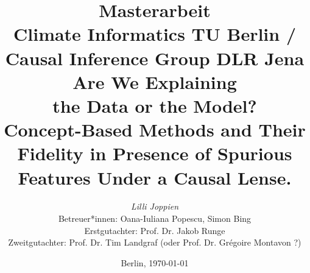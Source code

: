 %

\title{
{\small Masterarbeit}\\
{\small Climate Informatics TU Berlin / Causal Inference Group DLR Jena}\\
[7ex]
{Are We Explaining \\ the Data or the Model?} \\
[1ex]
{\LARGE Concept-Based Methods and
Their Fidelity in Presence of Spurious Features Under a Causal Lense.}}

\author{
{\emph{\normalsize Lilli Joppien}}\\
[18ex]   
{\normalsize Betreuer*innen: Oana-Iuliana Popescu, Simon Bing} \\
{\normalsize Erstgutachter: Prof. Dr. Jakob Runge} \\
{\normalsize Zweitgutachter: Prof. Dr. Tim Landgraf (oder Prof. Dr. Grégoire Montavon ?) }}
\vspace{6ex}
\date{\normalsize Berlin, \today}
\maketitle
